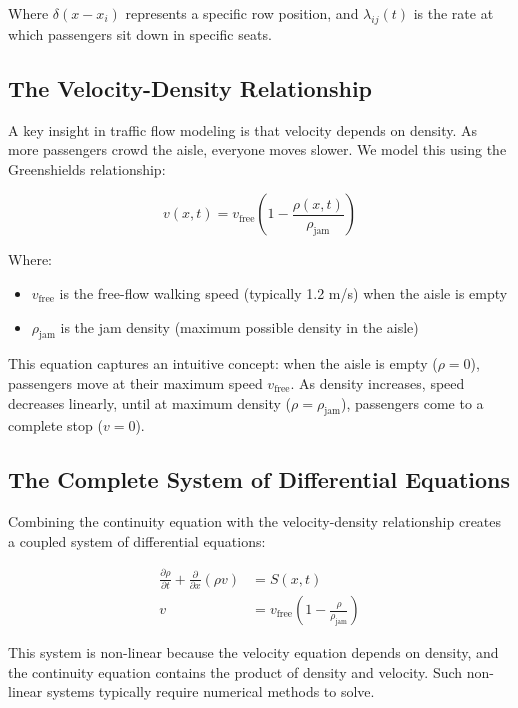 \documentclass[a4paper,12pt]{article}
\begin{document}
Where $\delta(x - x_i)$ represents a specific row position, and $\lambda_{ij}(t)$ is the rate at which passengers sit down in specific seats.

\subsection{The Velocity-Density Relationship}

A key insight in traffic flow modeling is that velocity depends on density. As more passengers crowd the aisle, everyone moves slower. We model this using the Greenshields relationship:

\begin{equation}
v(x,t) = v_{\text{free}} \left(1 - \frac{\rho(x,t)}{\rho_{\text{jam}}}\right)
\end{equation}

Where:
\begin{itemize}
    \item $v_{\text{free}}$ is the free-flow walking speed (typically 1.2 m/s) when the aisle is empty
    \item $\rho_{\text{jam}}$ is the jam density (maximum possible density in the aisle)
\end{itemize}

This equation captures an intuitive concept: when the aisle is empty ($\rho = 0$), passengers move at their maximum speed $v_{\text{free}}$. As density increases, speed decreases linearly, until at maximum density ($\rho = \rho_{\text{jam}}$), passengers come to a complete stop ($v = 0$).

\subsection{The Complete System of Differential Equations}

Combining the continuity equation with the velocity-density relationship creates a coupled system of differential equations:

\begin{align}
\frac{\partial \rho}{\partial t} + \frac{\partial}{\partial x}(\rho v) &= S(x,t) \\
v &= v_{\text{free}} \left(1 - \frac{\rho}{\rho_{\text{jam}}}\right)
\end{align}

This system is non-linear because the velocity equation depends on density, and the continuity equation contains the product of density and velocity. Such non-linear systems typically require numerical methods to solve.
\end{document}
